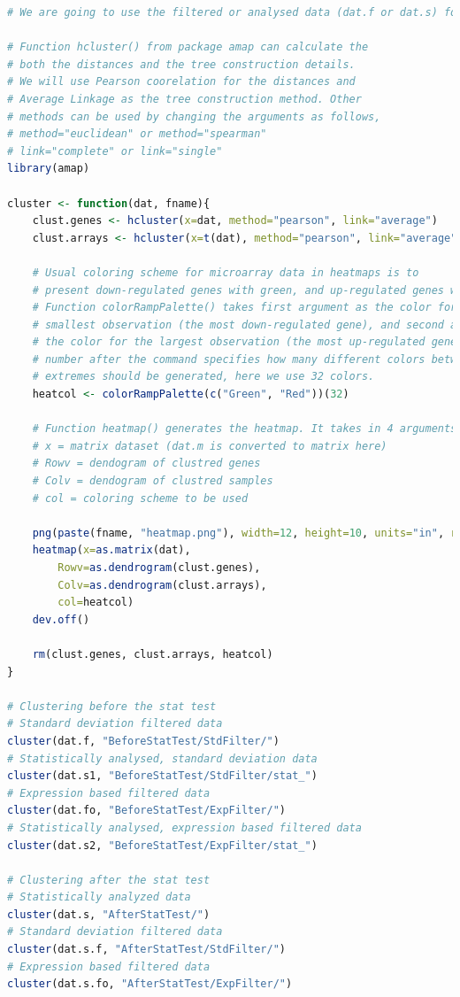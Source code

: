 \documentclass[oneside, a4paper, 11pt]{book}
\begin{document}
\begin{lstlisting}[language=R, caption=Heatmap \& Hierarchical Clustering]
# We are going to use the filtered or analysed data (dat.f or dat.s) for clustering.

# Function hcluster() from package amap can calculate the
# both the distances and the tree construction details.
# We will use Pearson coorelation for the distances and
# Average Linkage as the tree construction method. Other
# methods can be used by changing the arguments as follows,
# method="euclidean" or method="spearman"
# link="complete" or link="single"
library(amap)

cluster <- function(dat, fname){
    clust.genes <- hcluster(x=dat, method="pearson", link="average")
    clust.arrays <- hcluster(x=t(dat), method="pearson", link="average")

    # Usual coloring scheme for microarray data in heatmaps is to
    # present down-regulated genes with green, and up-regulated genes with red.
    # Function colorRampPalette() takes first argument as the color for the
    # smallest observation (the most down-regulated gene), and second argument
    # the color for the largest observation (the most up-regulated gene). The
    # number after the command specifies how many different colors between the
    # extremes should be generated, here we use 32 colors.
    heatcol <- colorRampPalette(c("Green", "Red"))(32)

    # Function heatmap() generates the heatmap. It takes in 4 arguments
    # x = matrix dataset (dat.m is converted to matrix here)
    # Rowv = dendogram of clustred genes
    # Colv = dendogram of clustred samples
    # col = coloring scheme to be used

    png(paste(fname, "heatmap.png"), width=12, height=10, units="in", res=250)
    heatmap(x=as.matrix(dat),
        Rowv=as.dendrogram(clust.genes),
        Colv=as.dendrogram(clust.arrays),
        col=heatcol)
    dev.off()

    rm(clust.genes, clust.arrays, heatcol)
}

# Clustering before the stat test
# Standard deviation filtered data
cluster(dat.f, "BeforeStatTest/StdFilter/")
# Statistically analysed, standard deviation data
cluster(dat.s1, "BeforeStatTest/StdFilter/stat_")
# Expression based filtered data
cluster(dat.fo, "BeforeStatTest/ExpFilter/")
# Statistically analysed, expression based filtered data
cluster(dat.s2, "BeforeStatTest/ExpFilter/stat_")

# Clustering after the stat test
# Statistically analyzed data
cluster(dat.s, "AfterStatTest/")
# Standard deviation filtered data
cluster(dat.s.f, "AfterStatTest/StdFilter/")
# Expression based filtered data
cluster(dat.s.fo, "AfterStatTest/ExpFilter/")
\end{lstlisting}
\end{document}
